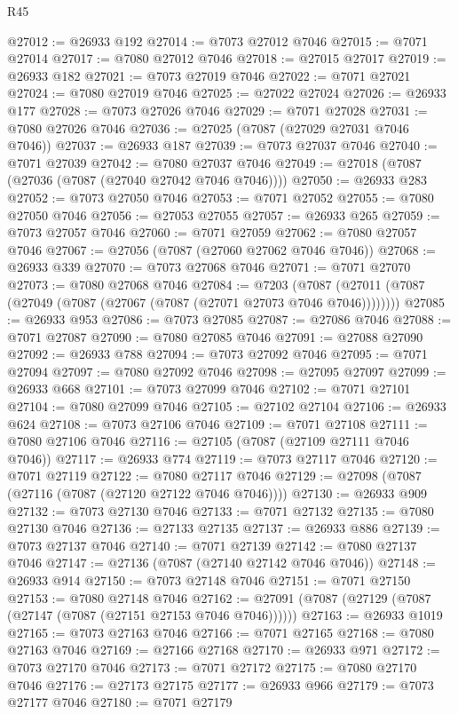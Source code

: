 \begin{lexlean}{R45}
\begin{coremodule}
{@27012 := @26933 @192
@27014 := @7073 @27012 @7046
@27015 := @7071 @27014
@27017 := @7080 @27012 @7046
@27018 := @27015 @27017
@27019 := @26933 @182
@27021 := @7073 @27019 @7046
@27022 := @7071 @27021
@27024 := @7080 @27019 @7046
@27025 := @27022 @27024
@27026 := @26933 @177
@27028 := @7073 @27026 @7046
@27029 := @7071 @27028
@27031 := @7080 @27026 @7046
@27036 := @27025 (@7087 (@27029 @27031 @7046 @7046))
@27037 := @26933 @187
@27039 := @7073 @27037 @7046
@27040 := @7071 @27039
@27042 := @7080 @27037 @7046
@27049 := @27018 (@7087 (@27036 (@7087 (@27040 @27042 @7046 @7046))))
@27050 := @26933 @283
@27052 := @7073 @27050 @7046
@27053 := @7071 @27052
@27055 := @7080 @27050 @7046
@27056 := @27053 @27055
@27057 := @26933 @265
@27059 := @7073 @27057 @7046
@27060 := @7071 @27059
@27062 := @7080 @27057 @7046
@27067 := @27056 (@7087 (@27060 @27062 @7046 @7046))
@27068 := @26933 @339
@27070 := @7073 @27068 @7046
@27071 := @7071 @27070
@27073 := @7080 @27068 @7046
@27084 := @7203
    (@7087 (@27011 (@7087 (@27049 (@7087 (@27067 (@7087 (@27071 @27073 @7046 @7046))))))))
@27085 := @26933 @953
@27086 := @7073 @27085
@27087 := @27086 @7046
@27088 := @7071 @27087
@27090 := @7080 @27085 @7046
@27091 := @27088 @27090
@27092 := @26933 @788
@27094 := @7073 @27092 @7046
@27095 := @7071 @27094
@27097 := @7080 @27092 @7046
@27098 := @27095 @27097
@27099 := @26933 @668
@27101 := @7073 @27099 @7046
@27102 := @7071 @27101
@27104 := @7080 @27099 @7046
@27105 := @27102 @27104
@27106 := @26933 @624
@27108 := @7073 @27106 @7046
@27109 := @7071 @27108
@27111 := @7080 @27106 @7046
@27116 := @27105 (@7087 (@27109 @27111 @7046 @7046))
@27117 := @26933 @774
@27119 := @7073 @27117 @7046
@27120 := @7071 @27119
@27122 := @7080 @27117 @7046
@27129 := @27098 (@7087 (@27116 (@7087 (@27120 @27122 @7046 @7046))))
@27130 := @26933 @909
@27132 := @7073 @27130 @7046
@27133 := @7071 @27132
@27135 := @7080 @27130 @7046
@27136 := @27133 @27135
@27137 := @26933 @886
@27139 := @7073 @27137 @7046
@27140 := @7071 @27139
@27142 := @7080 @27137 @7046
@27147 := @27136 (@7087 (@27140 @27142 @7046 @7046))
@27148 := @26933 @914
@27150 := @7073 @27148 @7046
@27151 := @7071 @27150
@27153 := @7080 @27148 @7046
@27162 := @27091 (@7087 (@27129 (@7087 (@27147 (@7087 (@27151 @27153 @7046 @7046))))))
@27163 := @26933 @1019
@27165 := @7073 @27163 @7046
@27166 := @7071 @27165
@27168 := @7080 @27163 @7046
@27169 := @27166 @27168
@27170 := @26933 @971
@27172 := @7073 @27170 @7046
@27173 := @7071 @27172
@27175 := @7080 @27170 @7046
@27176 := @27173 @27175
@27177 := @26933 @966
@27179 := @7073 @27177 @7046
@27180 := @7071 @27179
}
\end{coremodule}
\end{lexlean}
